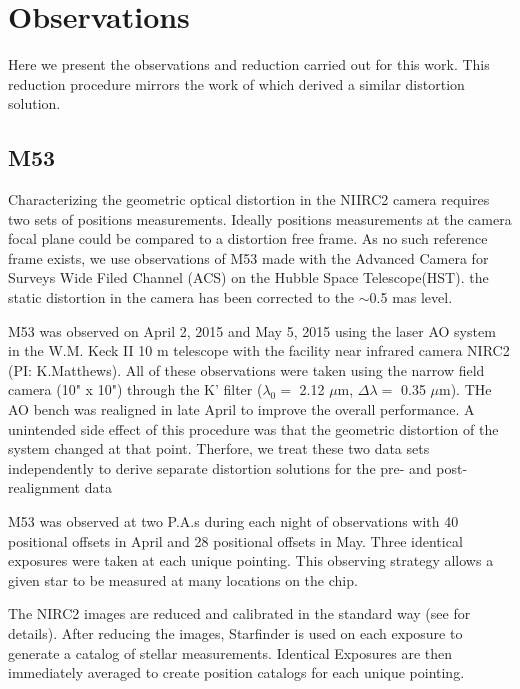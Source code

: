 \section{Observations}
Here we present the observations and reduction carried out for this work.  This reduction procedure mirrors the work of \cite{Yelda_2010} which derived a similar distortion solution.  
\subsection{M53}
Characterizing the geometric optical distortion in the NIIRC2 camera requires two sets of positions measurements.  Ideally positions measurements at the camera focal plane could be compared to a distortion free frame.  As no such reference frame exists, we use observations of M53 made with the Advanced Camera for Surveys Wide Filed Channel (ACS) on the Hubble Space Telescope(HST).  the static distortion in the camera has been corrected to the $\sim$0.5 mas level.

M53 was observed on April 2, 2015 and May 5, 2015 using the laser AO system in the W.M. Keck II 10 m telescope with the facility near infrared camera NIRC2 (PI: K.Matthews).  All of these observations were taken using the narrow field camera (10" x 10") through the K' filter ($\lambda_{0} = $ 2.12 $\mu$m, $\Delta\lambda =$ 0.35 $\mu$m).  THe AO bench was realigned  in late April to improve the overall performance.  A unintended side effect of this procedure was that the geometric distortion of the system changed at that point.  Therfore, we treat these two data sets independently to derive separate distortion solutions for the pre- and post- realignment data 

M53 was observed at two P.A.s during each night of observations with 40 positional offsets in April and 28 positional offsets in May.  Three identical exposures were taken at each unique pointing.  This observing strategy allows a given star to be measured at many locations on the chip.

The NIRC2 images are reduced and calibrated in the standard way (see \cite{Yelda_2010} for details).  After reducing the images, Starfinder \citep{Diloatti} is used on each exposure to generate a catalog of stellar measurements.  Identical Exposures are then immediately averaged to create position catalogs for each unique pointing.



